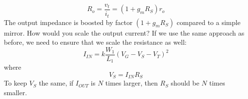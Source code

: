     \begin{equation}
        {R_o} = \frac{{{v_t}}}{{{i_t}}} = \left( {1 + {g_m}{R_S}} \right){r_o}
    \end{equation}
The output impedance is boosted by factor $(1 + {g_m}{R_S})$ compared to a simple mirror. How would you scale the output current?  If we use the same approach as before, we need to ensure that we scale the resistance as well:
    \begin{equation}
        {I_{IN}} = k\frac{{{W_1}}}{{{L_1}}}{({V_G} - {V_S} - {V_T})^2}
    \end{equation}
where
    \begin{equation}
        {V_S} = {I_{IN}}{R_S}
    \end{equation}
To keep $V_S$ the same, if $I_{OUT}$ is $N$ times larger, then $R_S$ should be $N$ times smaller. 
